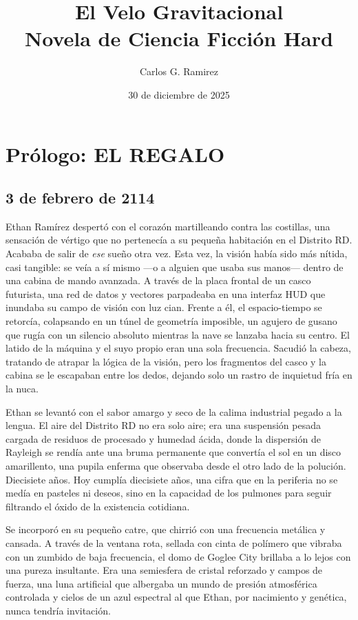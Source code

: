 \documentclass[12pt,a4paper]{book}
\title{\textbf{El Velo Gravitacional}\\[0.5cm]\large Novela de Ciencia Ficción Hard}
\author{Carlos G. Ramirez}
\date{30 de diciembre de 2025}
\begin{document}
\maketitle
\frontmatter
\tableofcontents
\newpage
\mainmatter

\chapter*{Prólogo: EL REGALO}

\section*{3 de febrero de 2114}

Ethan Ramírez despertó con el corazón martilleando contra las costillas, una sensación de vértigo que no pertenecía a su pequeña habitación en el Distrito RD. Acababa de salir de \textit{ese} sueño otra vez. Esta vez, la visión había sido más nítida, casi tangible: se veía a sí mismo ---o a alguien que usaba sus manos--- dentro de una cabina de mando avanzada. A través de la placa frontal de un casco futurista, una red de datos y vectores parpadeaba en una interfaz HUD que inundaba su campo de visión con luz cian. Frente a él, el espacio-tiempo se retorcía, colapsando en un túnel de geometría imposible, un agujero de gusano que rugía con un silencio absoluto mientras la nave se lanzaba hacia su centro. El latido de la máquina y el suyo propio eran una sola frecuencia. Sacudió la cabeza, tratando de atrapar la lógica de la visión, pero los fragmentos del casco y la cabina se le escapaban entre los dedos, dejando solo un rastro de inquietud fría en la nuca.

Ethan se levantó con el sabor amargo y seco de la calima industrial pegado a la lengua. El aire del Distrito RD no era solo aire; era una suspensión pesada cargada de residuos de procesado y humedad ácida, donde la dispersión de Rayleigh se rendía ante una bruma permanente que convertía el sol en un disco amarillento, una pupila enferma que observaba desde el otro lado de la polución. Diecisiete años. Hoy cumplía diecisiete años, una cifra que en la periferia no se medía en pasteles ni deseos, sino en la capacidad de los pulmones para seguir filtrando el óxido de la existencia cotidiana.

Se incorporó en su pequeño catre, que chirrió con una frecuencia metálica y cansada. A través de la ventana rota, sellada con cinta de polímero que vibraba con un zumbido de baja frecuencia, el domo de Goglee City brillaba a lo lejos con una pureza insultante. Era una semiesfera de cristal reforzado y campos de fuerza, una luna artificial que albergaba un mundo de presión atmosférica controlada y cielos de un azul espectral al que Ethan, por nacimiento y genética, nunca tendría invitación.
\end{document}
